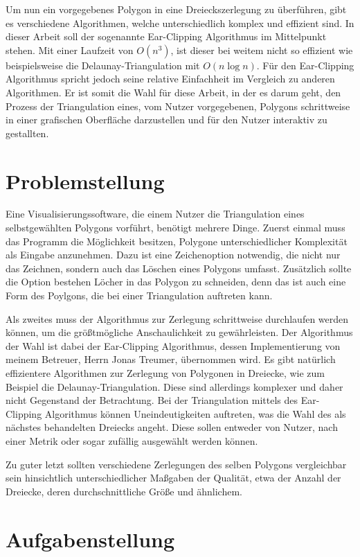 \documentclass[11pt]{article}
\begin{document}
Um nun ein vorgegebenes Polygon in eine Dreieckszerlegung zu überführen, gibt es verschiedene Algorithmen, welche unterschiedlich komplex und effizient sind. In dieser Arbeit soll der sogenannte Ear-Clipping Algorithmus im Mittelpunkt stehen.
Mit einer Laufzeit von $O(n^3)$, ist dieser bei weitem nicht so effizient wie beispielsweise die Delaunay-Triangulation mit $O(n \log n)$. Für den Ear-Clipping Algorithmus spricht jedoch seine relative Einfachheit im 
Vergleich zu anderen Algorithmen. Er ist somit die Wahl für diese Arbeit, in der es darum geht, den Prozess der Triangulation eines, vom Nutzer vorgegebenen, Polygons schrittweise in einer grafischen Oberfläche 
darzustellen und für den Nutzer interaktiv zu gestallten.

\section*{Problemstellung}
Eine Visualisierungssoftware, die einem Nutzer die Triangulation eines selbstgewählten Polygons vorführt, benötigt mehrere Dinge.
Zuerst einmal muss das Programm die Möglichkeit besitzen, Polygone unterschiedlicher Komplexität als Eingabe anzunehmen. Dazu ist eine Zeichenoption notwendig, die nicht nur das Zeichnen, sondern auch das Löschen eines Polygons umfasst.
Zusätzlich sollte die Option bestehen Löcher in das Polygon zu schneiden, denn das ist auch eine Form des Poylgons, die bei einer Triangulation auftreten kann.\break

Als zweites muss der Algorithmus zur Zerlegung schrittweise durchlaufen werden können, um die größtmögliche Anschaulichkeit zu gewährleisten.
Der Algorithmus der Wahl ist dabei der Ear-Clipping Algorithmus, dessen Implementierung von meinem Betreuer, Herrn Jonas Treumer, übernommen wird. Es gibt natürlich effizientere Algorithmen zur Zerlegung von Polygonen in Dreiecke, wie zum Beispiel die 
Delaunay-Triangulation. Diese sind allerdings komplexer und daher nicht Gegenstand der Betrachtung.
Bei der Triangulation mittels des Ear-Clipping Algorithmus können Uneindeutigkeiten auftreten, was die Wahl des als nächstes behandelten Dreiecks angeht.
Diese sollen entweder von Nutzer, nach einer Metrik oder sogar zufällig ausgewählt werden können.

Zu guter letzt sollten verschiedene Zerlegungen des selben Polygons vergleichbar sein hinsichtlich unterschiedlicher Maßgaben der Qualität, etwa der Anzahl der Dreiecke, deren durchschnittliche Größe und ähnlichem.

\section*{Aufgabenstellung}
\end{document}
